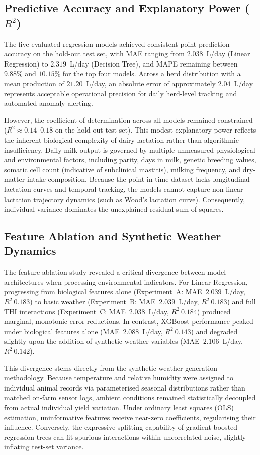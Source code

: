 \documentclass[conference]{IEEEtran}
\begin{document}
	\subsection{Predictive Accuracy and Explanatory Power ($R^2$)}
	The five evaluated regression models achieved consistent point-prediction accuracy on the hold-out test set, with MAE ranging from $2.038$~L/day (Linear Regression) to $2.319$~L/day (Decision Tree), and MAPE remaining between $9.88\%$ and $10.15\%$ for the top four models. Across a herd distribution with a mean production of $21.20$~L/day, an absolute error of approximately $2.04$~L/day represents acceptable operational precision for daily herd-level tracking and automated anomaly alerting.
	
	However, the coefficient of determination across all models remained constrained ($R^2 \approx 0.14$--$0.18$ on the hold-out test set). This modest explanatory power reflects the inherent biological complexity of dairy lactation rather than algorithmic insufficiency. Daily milk output is governed by multiple unmeasured physiological and environmental factors, including parity, days in milk, genetic breeding values, somatic cell count (indicative of subclinical mastitis), milking frequency, and dry-matter intake composition. Because the point-in-time dataset lacks longitudinal lactation curves and temporal tracking, the models cannot capture non-linear lactation trajectory dynamics (such as Wood's lactation curve). Consequently, individual variance dominates the unexplained residual sum of squares.
	
	\subsection{Feature Ablation and Synthetic Weather Dynamics}
	The feature ablation study revealed a critical divergence between model architectures when processing environmental indicators. For Linear Regression, progressing from biological features alone (Experiment~A: MAE~$2.039$~L/day, $R^2~0.183$) to basic weather (Experiment~B: MAE~$2.039$~L/day, $R^2~0.183$) and full THI interactions (Experiment~C: MAE~$2.038$~L/day, $R^2~0.184$) produced marginal, monotonic error reductions. In contrast, XGBoost performance peaked under biological features alone (MAE~$2.088$~L/day, $R^2~0.143$) and degraded slightly upon the addition of synthetic weather variables (MAE~$2.106$~L/day, $R^2~0.142$).
	
	This divergence stems directly from the synthetic weather generation methodology. Because temperature and relative humidity were assigned to individual animal records via parameterised seasonal distributions rather than matched on-farm sensor logs, ambient conditions remained statistically decoupled from actual individual yield variation. Under ordinary least squares (OLS) estimation, uninformative features receive near-zero coefficients, regularising their influence. Conversely, the expressive splitting capability of gradient-boosted regression trees can fit spurious interactions within uncorrelated noise, slightly inflating test-set variance.
	
\end{document}
